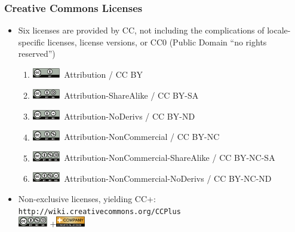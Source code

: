 \documentclass[mathserif,xcolor=dvipsnames,hyperref={bookmarks=true}]{beamer}
\begin{document}
     \begin{frame}[t]
         \frametitle{Creative Commons Licenses}
         \begin{itemize}
             \item<2-> Six licenses are provided by CC, not including the
             complications of locale-specific licenses, license versions, or
             CC0 (Public Domain ``no rights reserved'')
             \begin{enumerate}
               \item<3-> \includegraphics[width=0.1\textwidth]{by.pdf}\ Attribution
               / CC BY
               \item<4-> \includegraphics[width=0.1\textwidth]{by_sa.pdf}\
               Attribution-ShareAlike / CC BY-SA
               \item<5-> \includegraphics[width=0.1\textwidth]{by_nd.pdf}\
               Attribution-NoDerivs / CC BY-ND
               \item<6-> \includegraphics[width=0.1\textwidth]{by_nc.pdf}\
               Attribution-NonCommercial / CC BY-NC
               \item<7-> \includegraphics[width=0.1\textwidth]{by_nc_sa.pdf}\
               Attribution-NonCommercial-ShareAlike / CC BY-NC-SA
               \item<8-> \includegraphics[width=0.1\textwidth]{by_nc_nd.pdf}\
               Attribution-NonCommercial-NoDerivs / CC BY-NC-ND
             \end{enumerate}
             \item<9-> Non-exclusive licenses, yielding CC+:
             \texttt{http://wiki.creativecommons.org/CCPlus} \\
               \includegraphics[width=0.1\textwidth]{by_nc_sa.pdf}
               +\includegraphics[width=0.1\textwidth]{CommercialLicenseButton.pdf}
         \end{itemize}
     \end{frame}
\end{document}
